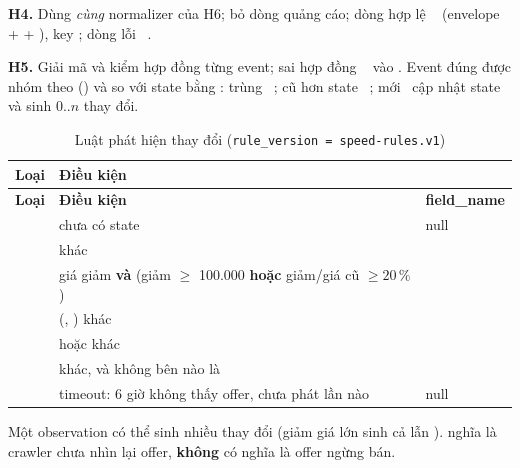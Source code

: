 \textbf{H4.} Dùng \emph{cùng} normalizer của H6; bỏ dòng quảng cáo; dòng hợp lệ \ra\  (envelope +
 + ), key ; dòng lỗi \ra\ .

\textbf{H5.} Giải mã và kiểm hợp đồng từng event; sai hợp đồng \ra\  vào . Event đúng được nhóm theo
 () và so với state bằng : trùng  \ra\ ;
cũ hơn state \ra\ ; mới \ra\ cập nhật state và sinh 0..$n$ thay đổi.

\begin{xltabular}{\linewidth}{@{}L{40mm}Y L{30mm}@{}}
  \caption{Luật phát hiện thay đổi (\texttt{rule\_version = speed-rules.v1})}\label{tab:change-rules}\\
  \toprule
  \textbf{Loại} & \textbf{Điều kiện} & \textbf{} \\
  \midrule
  \endfirsthead
  \toprule \textbf{Loại} & \textbf{Điều kiện} & \textbf{field\_name} \\ \midrule
  \endhead
   & chưa có state & null \\
   &  khác &  \\
   & giá giảm \textbf{và} (giảm $\ge$ 100.000 \textbf{hoặc} giảm/giá cũ $\ge 20\,\%$) &  \\
   & (, ) khác &  \\
   &  hoặc  khác &  \\
   & khác, và không bên nào là  &  \\
   & timeout: 6 giờ không thấy offer, chưa phát lần nào & null \\
  \bottomrule
\end{xltabular}

Một observation có thể sinh nhiều thay đổi (giảm giá lớn sinh cả  lẫn ).
 nghĩa là crawler chưa nhìn lại offer, \textbf{không} có nghĩa là offer ngừng bán.

